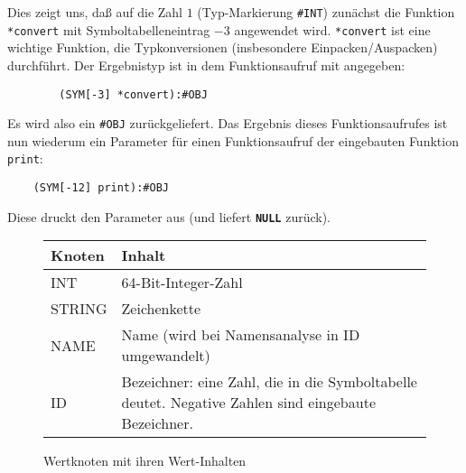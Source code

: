 \documentclass[11pt,a4paper]{article}
\newcommand{\Ckw}[1]{\textbf{\texttt{#1}}}
\begin{document}
Dies zeigt uns, daß auf die Zahl $1$ (Typ-Markierung \texttt{\#INT}) zunächst die Funktion
\texttt{*convert} mit Symboltabelleneintrag $-3$ angewendet wird.  \texttt{*convert} ist eine wichtige Funktion, die Typkonversionen
(insbesondere Einpacken/Auspacken) durchführt.  Der Ergebnistyp ist in dem Funktionsaufruf mit angegeben:
\begin{verbatim}
        (SYM[-3] *convert):#OBJ
\end{verbatim}
Es wird also ein \texttt{\#OBJ} zurückgeliefert.  Das Ergebnis dieses Funktionsaufrufes ist nun wiederum ein Parameter
für einen Funktionsaufruf der eingebauten Funktion \texttt{print}:
\begin{verbatim}
    (SYM[-12] print):#OBJ
\end{verbatim}
Diese druckt den Parameter aus (und liefert \Ckw{NULL} zurück).

\begin{figure}[h]
\begin{tabular}{|p{3cm}|p{14cm}|}
\hline
\textbf{Knoten} & \textbf{Inhalt} \\
\hline
\hline
\textsf{INT} &  64-Bit-Integer-Zahl\\
\hline
\textsf{STRING} & Zeichenkette \\
\hline
\textsf{NAME  } & Name (wird bei Namensanalyse in \textsf{ID} umgewandelt) \\
\hline
\textsf{ID    } & Bezeichner: eine Zahl, die in die Symboltabelle deutet.  Negative Zahlen sind eingebaute Bezeichner.  \\
\hline
\end{tabular}
\caption{Wertknoten mit ihren Wert-Inhalten}\label{fig:valnodes}
\end{figure}
\end{document}
